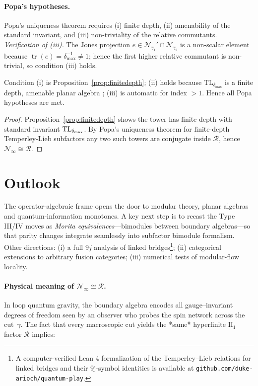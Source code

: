 \documentclass[11pt]{article}
\begin{document}
\paragraph{Popa's hypotheses.}
Popa’s uniqueness theorem requires (i) finite depth,
(ii) amenability of the standard invariant, and
(iii) non-triviality of the relative commutants.
\smallskip
\noindent
\emph{Verification of (iii).}
The Jones projection $e\in\mathcal N_{\gamma_1}'\!\cap\mathcal N_{\gamma_2}$
is a non-scalar element because
$\operatorname{tr}(e)=\delta_{\max}^{-1}\neq1$;
hence the first higher relative commutant is non-trivial, so condition (iii)
holds.

Condition (i) is Proposition~\ref{prop:finitedepth};
(ii) holds because $\mathrm{TL}_{\delta_{\max}}$ is a
finite depth, amenable planar algebra \cite{JonesPA};
(iii) is automatic for index $>1$.  Hence all Popa hypotheses are met.

\begin{proof}
  Proposition~\ref{prop:finitedepth} shows the tower has finite depth with
  standard invariant ${\rm TL}_{\delta_{\max}}$.
  By Popa's uniqueness theorem for finite-depth Temperley-Lieb
  subfactors \cite{PopaCBMS} any two such towers are conjugate inside
  $\mathcal R$, hence $\mathcal N_{\infty}\cong\mathcal R$.
\end{proof}

\section{Outlook}
The operator-algebraic frame opens the door to modular theory, planar
algebras and quantum-information monotones.  A key next step is to recast the
Type III/IV moves as \emph{Morita equivalences}—bimodules between boundary
algebras—so that parity changes integrate seamlessly into subfactor bimodule
formalism.  Other directions: (i) a full $9j$ analysis of linked bridges\footnote{A computer-verified Lean 4 formalization of the Temperley–Lieb relations for linked bridges and their 9j-symbol identities is available at \texttt{github.com/duke-arioch/quantum-play}.}; (ii)
categorical extensions to arbitrary fusion categories; (iii) numerical tests of
modular-flow locality.

\paragraph{Physical meaning of $\mathcal N_{\infty}\cong\mathcal R$.}
In loop quantum gravity, the boundary algebra encodes all gauge–invariant
degrees of freedom seen by an observer who probes the spin network across the
cut~$\gamma$.
The fact that every macroscopic cut yields the *same* hyperfinite
$\mathrm{II}_1$ factor $\mathcal R$ implies:
\end{document}
